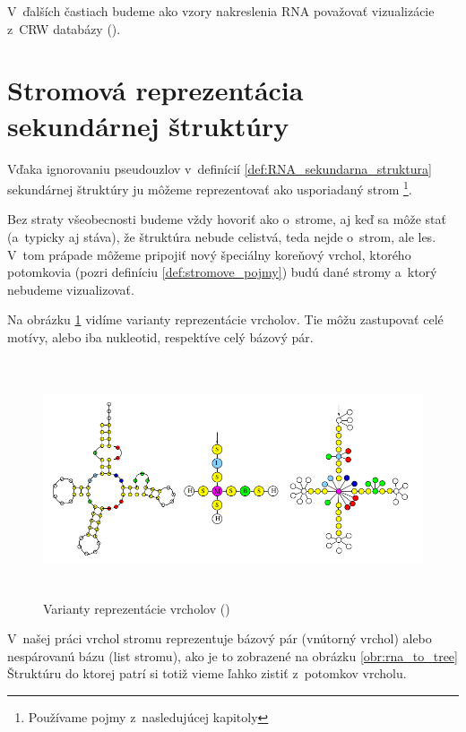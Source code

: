 V~ďalších častiach budeme ako vzory nakreslenia RNA považovať vizualizácie
z~CRW databázy (\citet{CRW}).




\section{Stromová reprezentácia sekundárnej štruktúry}

Vďaka ignorovaniu pseudouzlov v~definícií \ref{def:RNA_sekundarna_struktura} sekundárnej
štruktúry ju môžeme reprezentovať ako usporiadaný strom
\footnote{Používame pojmy z~nasledujúcej kapitoly }.

Bez straty všeobecnosti budeme vždy hovoriť ako o~strome, aj keď sa môže stať
(a~typicky aj stáva), že štruktúra nebude celistvá, teda nejde o~strom, ale les.
V~tom prápade môžeme pripojiť nový špeciálny koreňový vrchol, ktorého potomkovia
(pozri definíciu \ref{def:stromove_pojmy}) budú dané stromy a~ktorý nebudeme vizualizovať.

Na obrázku \ref{obr:RNA_stromova_reprezentacia} vidíme varianty reprezentácie vrcholov.
Tie môžu zastupovať celé motívy, alebo iba nukleotid, respektíve celý bázový pár.

\begin{figure}
  \centering
  \includegraphics[width=130mm, height=70mm]{../img/stromova_reprezentacia_rna}
  \caption{Varianty reprezentácie vrcholov (\citet{RNA_DRAW})}
  \label{obr:RNA_stromova_reprezentacia}
\end{figure}

V~našej práci vrchol stromu reprezentuje bázový pár (vnútorný vrchol)
alebo nespárovanú bázu (list stromu), ako je to zobrazené na obrázku \ref{obr:rna_to_tree}
Štruktúru do ktorej patrí si totiž vieme ľahko zistiť z~potomkov vrcholu.






